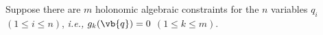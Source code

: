 \documentclass[a4paper,12pt]{report}
\begin{document}
Suppose there are \(m\) holonomic algebraic constraints for the \(n\) variables \(q_{i} \) \((1 \le i \le n)\), \textit{i.e.,} \(g_{k}(\vb{q} ) = 0 \) \((1 \le k \le m)\).
\end{document}
